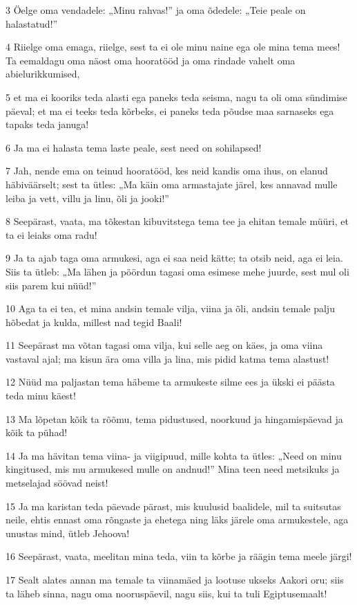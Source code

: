\par 3 Öelge oma vendadele: „Minu rahvas!” ja oma õdedele: „Teie peale on halastatud!”
\par 4 Riielge oma emaga, riielge, sest ta ei ole minu naine ega ole mina tema mees! Ta eemaldagu oma näost oma hooratööd ja oma rindade vahelt oma abielurikkumised,
\par 5 et ma ei kooriks teda alasti ega paneks teda seisma, nagu ta oli oma sündimise päeval; et ma ei teeks teda kõrbeks, ei paneks teda põudse maa sarnaseks ega tapaks teda januga!
\par 6 Ja ma ei halasta tema laste peale, sest need on sohilapsed!
\par 7 Jah, nende ema on teinud hooratööd, kes neid kandis oma ihus, on elanud häbiväärselt; sest ta ütles: „Ma käin oma armastajate järel, kes annavad mulle leiba ja vett, villu ja linu, õli ja jooki!”
\par 8 Seepärast, vaata, ma tõkestan kibuvitstega tema tee ja ehitan temale müüri, et ta ei leiaks oma radu!
\par 9 Ja ta ajab taga oma armukesi, aga ei saa neid kätte; ta otsib neid, aga ei leia. Siis ta ütleb: „Ma lähen ja pöördun tagasi oma esimese mehe juurde, sest mul oli siis parem kui nüüd!”
\par 10 Aga ta ei tea, et mina andsin temale vilja, viina ja õli, andsin temale palju hõbedat ja kulda, millest nad tegid Baali!
\par 11 Seepärast ma võtan tagasi oma vilja, kui selle aeg on käes, ja oma viina vastaval ajal; ma kisun ära oma villa ja lina, mis pidid katma tema alastust!
\par 12 Nüüd ma paljastan tema häbeme ta armukeste silme ees ja ükski ei päästa teda minu käest!
\par 13 Ma lõpetan kõik ta rõõmu, tema pidustused, noorkuud ja hingamispäevad ja kõik ta pühad!
\par 14 Ja ma hävitan tema viina- ja viigipuud, mille kohta ta ütles: „Need on minu kingitused, mis mu armukesed mulle on andnud!” Mina teen need metsikuks ja metselajad söövad neist!
\par 15 Ja ma karistan teda päevade pärast, mis kuulusid baalidele, mil ta suitsutas neile, ehtis ennast oma rõngaste ja ehetega ning läks järele oma armukestele, aga unustas mind, ütleb Jehoova!
\par 16 Seepärast, vaata, meelitan mina teda, viin ta kõrbe ja räägin tema meele järgi!
\par 17 Sealt alates annan ma temale ta viinamäed ja lootuse ukseks Aakori oru; siis ta läheb sinna, nagu oma nooruspäevil, nagu siis, kui ta tuli Egiptusemaalt!
